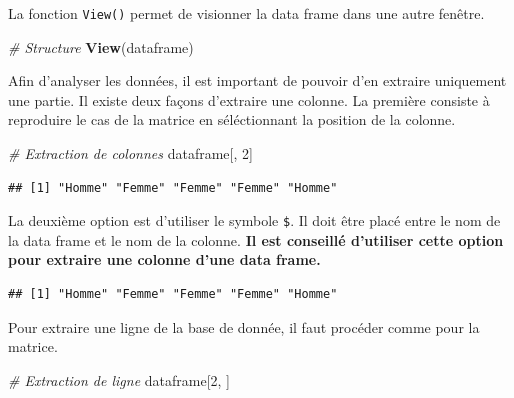 \documentclass[
]{book}
\newenvironment{Shaded}{\begin{snugshade}}{\end{snugshade}}
\newcommand{\CommentTok}[1]{\textcolor[rgb]{0.56,0.35,0.01}{\textit{#1}}}
\newcommand{\DecValTok}[1]{\textcolor[rgb]{0.00,0.00,0.81}{#1}}
\newcommand{\FunctionTok}[1]{\textcolor[rgb]{0.13,0.29,0.53}{\textbf{#1}}}
\newcommand{\NormalTok}[1]{#1}
\newcommand{\SpecialCharTok}[1]{\textcolor[rgb]{0.81,0.36,0.00}{\textbf{#1}}}
\begin{document}
La fonction \texttt{View()} permet de visionner la data frame dans une autre fenêtre.

\begin{Shaded}
\begin{Highlighting}[]
\CommentTok{\# Structure}
\FunctionTok{View}\NormalTok{(dataframe)}
\end{Highlighting}
\end{Shaded}

Afin d'analyser les données, il est important de pouvoir d'en extraire uniquement une partie. Il existe deux façons d'extraire une colonne. La première consiste à reproduire le cas de la matrice en séléctionnant la position de la colonne.

\begin{Shaded}
\begin{Highlighting}[]
\CommentTok{\# Extraction de colonnes}
\NormalTok{dataframe[, }\DecValTok{2}\NormalTok{]}
\end{Highlighting}
\end{Shaded}

\begin{verbatim}
## [1] "Homme" "Femme" "Femme" "Femme" "Homme"
\end{verbatim}

La deuxième option est d'utiliser le symbole \texttt{\$}. Il doit être placé entre le nom de la data frame et le nom de la colonne.
\textbf{Il est conseillé d'utiliser cette option pour extraire une colonne d'une data frame.}

\begin{Shaded}
\end{Shaded}

\begin{verbatim}
## [1] "Homme" "Femme" "Femme" "Femme" "Homme"
\end{verbatim}

Pour extraire une ligne de la base de donnée, il faut procéder comme pour la matrice.

\begin{Shaded}
\begin{Highlighting}[]
\CommentTok{\# Extraction de ligne}
\NormalTok{dataframe[}\DecValTok{2}\NormalTok{, ]}
\end{Highlighting}
\end{Shaded}
\end{document}
